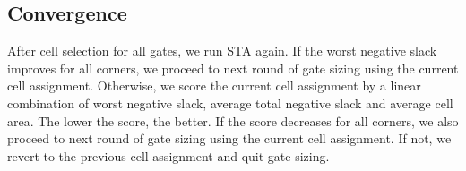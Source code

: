 \subsection{Convergence}
\label{sec:sizing_converge}
After cell selection for all gates, we run STA again. If the worst negative slack improves for all corners, we proceed to next round of gate sizing using the current cell assignment. Otherwise, we score the current cell assignment by a linear combination of worst negative slack, average total negative slack and average cell area. The lower the score, the better. If the score decreases for all corners, we also proceed to next round of gate sizing using the current cell assignment. If not, we revert to the previous cell assignment and quit gate sizing.


%


